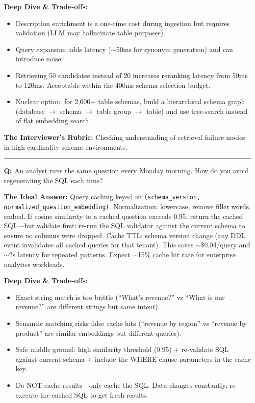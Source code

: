 \textbf{Deep Dive \& Trade-offs:}
\begin{itemize}
  \item Description enrichment is a one-time cost during ingestion but requires validation (LLM may hallucinate table purposes).
  \item Query expansion adds latency ($\sim$50ms for synonym generation) and can introduce noise.
  \item Retrieving 50 candidates instead of 20 increases reranking latency from 50ms to 120ms. Acceptable within the 400ms schema selection budget.
  \item Nuclear option: for 2,000+ table schemas, build a hierarchical schema graph (database $\rightarrow$ schema $\rightarrow$ table group $\rightarrow$ table) and use tree-search instead of flat embedding search.
\end{itemize}

\textbf{The Interviewer's Rubric:} Checking understanding of retrieval failure modes in high-cardinality schema environments.

\bigskip\hrule\bigskip

\textbf{Q:} An analyst runs the same question every Monday morning. How do you avoid regenerating the SQL each time?

\textbf{The Ideal Answer:} Query caching keyed on \texttt{(schema\_version, normalized\_question\_embedding)}. Normalization: lowercase, remove filler words, embed. If cosine similarity to a cached question exceeds 0.95, return the cached SQL---but validate first: re-run the SQL validator against the current schema to ensure no columns were dropped. Cache TTL: schema version change (any DDL event invalidates all cached queries for that tenant). This saves $\sim$\$0.04/query and $\sim$2s latency for repeated patterns. Expect $\sim$15\% cache hit rate for enterprise analytics workloads.

\textbf{Deep Dive \& Trade-offs:}
\begin{itemize}
  \item Exact string match is too brittle (``What's revenue?'' vs ``What is our revenue?'' are different strings but same intent).
  \item Semantic matching risks false cache hits (``revenue by region'' vs ``revenue by product'' are similar embeddings but different queries).
  \item Safe middle ground: high similarity threshold (0.95) + re-validate SQL against current schema + include the WHERE clause parameters in the cache key.
  \item Do NOT cache results---only cache the SQL. Data changes constantly; re-execute the cached SQL to get fresh results.
\end{itemize}


